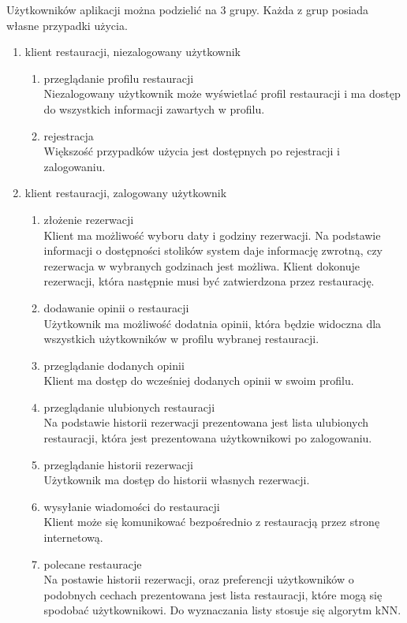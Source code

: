 \documentclass{article}
\begin{document}
Użytkowników aplikacji można podzielić na 3 grupy. Każda z grup posiada własne przypadki użycia.
\begin{enumerate}
\item klient restauracji, niezalogowany użytkownik
\begin{enumerate}
	\item przeglądanie profilu restauracji \\
	Niezalogowany użytkownik może wyświetlać profil restauracji i ma dostęp do wszystkich informacji zawartych w profilu.
	\item rejestracja \\
	Większość przypadków użycia jest dostępnych po rejestracji i zalogowaniu.
\end{enumerate}
	\item klient restauracji, zalogowany użytkownik
\begin{enumerate}
	\item złożenie rezerwacji \\
	Klient ma możliwość wyboru daty i godziny rezerwacji. Na podstawie informacji o dostępności stolików system daje informację zwrotną, czy rezerwacja w wybranych godzinach jest możliwa. Klient dokonuje rezerwacji, która następnie musi być zatwierdzona przez restaurację.
	\item dodawanie opinii o restauracji \\
	Użytkownik ma możliwość dodatnia opinii, która będzie widoczna dla wszystkich użytkowników w profilu wybranej restauracji.
	\item przeglądanie dodanych opinii \\
	Klient ma dostęp do wcześniej dodanych opinii w swoim profilu.
	\item przeglądanie ulubionych restauracji \\
	Na podstawie historii rezerwacji prezentowana jest lista ulubionych restauracji, która jest prezentowana użytkownikowi po zalogowaniu.
	\item przeglądanie historii rezerwacji \\
	Użytkownik ma dostęp do historii własnych rezerwacji.
	\item wysyłanie wiadomości do restauracji \\
	Klient może się komunikować bezpośrednio z restauracją przez stronę internetową.
	\item polecane restauracje \\
	Na postawie historii rezerwacji, oraz preferencji użytkowników o podobnych cechach prezentowana jest lista restauracji, które mogą się spodobać użytkownikowi. Do wyznaczania listy stosuje się algorytm kNN.

\end{enumerate}
\end{enumerate}
\end{document}
